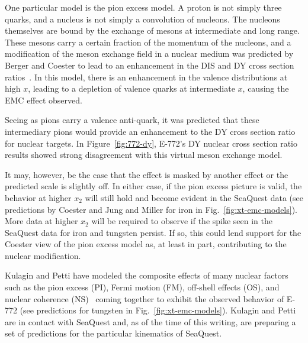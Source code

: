 One particular model is the pion excess model. A proton is not simply three quarks, and a nucleus is not simply a convolution of nucleons. The nucleons themselves are bound by the exchange of mesons at intermediate and long range. These mesons carry a certain fraction of the momentum of the nucleons, and a modification of the meson exchange field in a nuclear medium was predicted by Berger and Coester to lead to an enhancement in the DIS and DY cross section ratios~\cite{Berger:1985dr}. In this model, there is an enhancement in the valence distributions at high $x$, leading to a depletion of valence quarks at intermediate $x$, causing the EMC effect observed.

Seeing as pions carry a valence anti-quark, it was predicted that these intermediary pions would provide an enhancement to the DY cross section ratio for nuclear targets. In Figure~\ref{fig:772-dy}, E-772's DY nuclear cross section ratio results showed strong disagreement with this virtual meson exchange model.

It may, however, be the case that the effect is masked by another effect or the predicted scale is slightly off. In either case, if the pion excess picture is valid, the behavior at higher $x_2$ will still hold and become evident in the SeaQuest data (see predictions by Coester and Jung and Miller for iron in Fig.~\ref{fig:xt-emc-models}). More data at higher $x_2$ will be required to observe if the spike seen in the SeaQuest data for iron and tungsten persist. If so, this could lend support for the Coester view of the pion excess model as, at least in part, contributing to the nuclear modification.

Kulagin and Petti have modeled the composite effects of many nuclear factors such as the pion excess (PI), Fermi motion (FM), off-shell effects (OS), and  nuclear coherence (NS)~\cite{Kulagin:2015lkm} coming together to exhibit the observed behavior of E-772 (see predictions for tungsten in Fig.~\ref{fig:xt-emc-models}). Kulagin and Petti are in contact with SeaQuest and, as of the time of this writing, are preparing a set of predictions for the particular kinematics of SeaQuest. 


